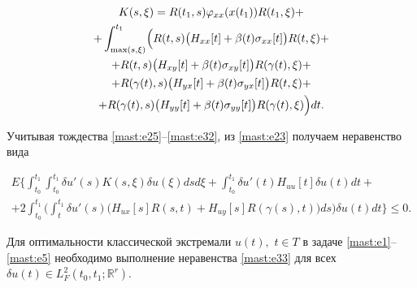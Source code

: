 \begin{multline}

  \label{mast:e32}

K(s,\xi)= R(t_{1},s)\varphi_{xx}(x(t_{1})) R(t_{1},\xi)+

\\

+\int^{t_{1}}_{\max (s, \xi)} \Bigl( R(t,s) \bigl( H_{xx}[t] +\beta (t) \sigma_{xx}[t]\bigr) R(t,\xi)+

\\

+R(t,s) \bigl( H_{xy}[t] +\beta (t) \sigma_{xy}[t]\bigr) 

R(\gamma(t),\xi)+

\\ 

+R(\gamma(t),s)  \bigl( H_{yx}[t] +\beta (t) \sigma_{yx}[t]\bigr) R(t,\xi)+\\

 +R(\gamma(t),s) \bigl( H_{yy}[t] +\beta (t) \sigma_{yy}[t]\bigr) R(\gamma(t),\xi) \Bigr) dt.

 \end{multline}

 

 

Учитывая тождества \eqref{mast:e25}--\eqref{mast:e32}, из \eqref{mast:e23}  получаем неравенство  вида 

 \begin{multline}

   \label{mast:e33}

E \biggl\lbrace 

\int^{t_{1}}_{t_{0}} \int^{t_{1}}_{t_{0}} \delta u'(s) K(s,\xi) \delta u(\xi) ds d\xi +\int^{t_{1}}_{t_{0}} \delta u'(t) H_{uu}[t] \delta u(t) dt+ \\

+2 \int^{t_{1}}_{t_{0}} \biggl(  \int^{t_{1}}_{t} \delta u'(s) \bigl( H_{ux}[s]R(s,t)+ H_{uy}[s]R(\gamma(s),t)  \bigr) ds \biggr)   \delta u(t) dt \biggr\rbrace \leq 0.  

 \end{multline}

 

 \smallskip

 

 \begin{theorem}

 Для оптимальности классической экстремали $ u(t) ,$ $ t\in T $ в задаче \eqref{mast:e1}--\eqref{mast:e5}  необходимо выполнение неравенства \eqref{mast:e33} для всех $ \delta u(t)\in L^{2}_{F}(t_{0}, t_{1}; \mathbb R^{r}) $. 

\end{theorem}




